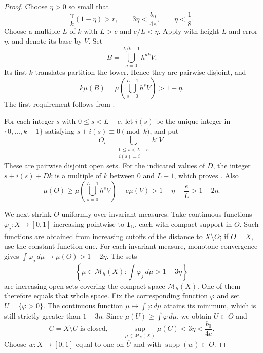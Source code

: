 \begin{proof}
Choose $\eta>0$ so small that
\begin{equation}
\label{eq:allocation-error-budget}
 \frac\gamma k(1-\eta)>r,
 \qquad 3\eta<\frac{b_0}{4e},
 \qquad \eta<\frac18.
\end{equation}
Choose a multiple $L$ of $k$ with $L>e$ and $e/L<\eta$.
Apply  with height $L$ and error $\eta$, and
denote its base by $V$.  Set
\[
 B=\bigcup_{a=0}^{L/k-1}h^{ak}V.
\]
Its first $k$ translates partition the tower.  Hence they are pairwise
disjoint, and
\[
 k\mu(B)=\mu\left(\bigcup_{s=0}^{L-1}h^sV\right)>1-\eta.
\]
The first requirement follows from
.

For each integer $s$ with $0\leq s<L-e$, let $i(s)$ be the unique
integer in $\{0,\ldots,k-1\}$ satisfying $s+i(s)\equiv0\pmod{k}$,
and put
\[
 O_i=\bigcup_{\substack{0\leq s<L-e\\ i(s)=i}}h^sV.
\]
These are pairwise disjoint open sets.  For the indicated values of
$D$, the integer $s+i(s)+Dk$ is a multiple of $k$ between $0$ and
$L-1$, which proves .  Also
\[
 \mu(O)\geq\mu\left(\bigcup_{s=0}^{L-1}h^sV\right)-e\mu(V)
 >1-\eta-\frac eL>1-2\eta.
\]

We next shrink $O$ uniformly over invariant measures.  Take continuous
functions $\varphi_j:X\to[0,1]$ increasing pointwise to
$\mathbf 1_O$, each with compact support in $O$.  Such functions are
obtained from increasing cutoffs of the distance to $X\setminus O$;
if $O=X$, use the constant function one.  For each invariant measure,
monotone convergence gives
$\int\varphi_j\,d\mu\to\mu(O)>1-2\eta$.
The sets
\[
 \left\{\mu\in\mathcal M_h(X):
                  \int\varphi_j\,d\mu>1-3\eta\right\}
\]
are increasing open sets covering the compact space
$\mathcal M_h(X)$.  One of them therefore equals that whole space.
Fix the corresponding function $\varphi$ and set $U=\{\varphi>0\}$.
The continuous function $\mu\mapsto\int\varphi\,d\mu$ attains its
minimum, which is still strictly greater than $1-3\eta$.
Since $\mu(U)\geq\int\varphi\,d\mu$, we obtain
$\overline U\subset O$ and
\begin{equation}
\label{eq:closed-exception-measure}
 C=X\setminus U\text{ is closed},\qquad
 \sup_{\mu\in\mathcal M_h(X)}\mu(C)<3\eta<\frac{b_0}{4e}.
\end{equation}
Choose $w:X\to[0,1]$ equal to one on $\overline U$ and with
$\operatorname{supp}(w)\subset O$.


\end{proof}
